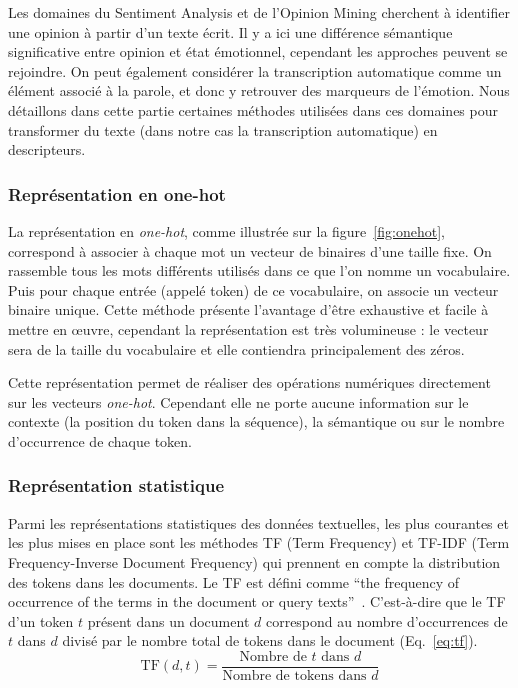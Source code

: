 Les domaines du Sentiment Analysis et de l'Opinion Mining cherchent à identifier une opinion à partir d'un texte écrit. Il y a ici une différence sémantique significative entre opinion et état émotionnel, cependant les approches peuvent se rejoindre. On peut également considérer la transcription automatique comme un élément associé à la parole, et donc y retrouver des marqueurs de l'émotion. Nous détaillons dans cette partie certaines méthodes utilisées dans ces domaines pour transformer du texte (dans notre cas la transcription automatique) en descripteurs.

\subsubsection{Représentation en one-hot}
La représentation en \textit{one-hot}, comme illustrée sur la figure~\ref{fig:onehot}, correspond à associer à chaque mot un vecteur de binaires d'une taille fixe. On rassemble tous les mots différents utilisés dans ce que l'on nomme un vocabulaire. Puis pour chaque entrée (appelé token) de ce vocabulaire, on associe un vecteur binaire unique. Cette méthode présente l'avantage d'être exhaustive et facile à mettre en œuvre, cependant la représentation est très volumineuse : le vecteur sera de la taille du vocabulaire et elle contiendra principalement des zéros.



Cette représentation permet de réaliser des opérations numériques directement sur les vecteurs \textit{one-hot}. Cependant elle ne porte aucune information sur le contexte (la position du token dans la séquence), la sémantique ou sur le nombre d’occurrence de chaque token.

\subsubsection{Représentation statistique}
Parmi les représentations statistiques des données textuelles, les plus courantes et les plus mises en place sont les méthodes TF (Term Frequency) et TF-IDF (Term Frequency-Inverse Document Frequency) qui prennent en compte la distribution des tokens dans les documents.
Le TF est défini comme ``the frequency of occurrence of the terms in the document or query texts''~\cite{salton_tf_idf}.
C'est-à-dire que le TF d'un token $t$ présent dans un document $d$ correspond au nombre d’occurrences de $t$ dans $d$ divisé par le nombre total de tokens dans le document (Eq.~\ref{eq:tf}).
\begin{equation}
    \text{TF}(d,t) = \dfrac{\text{Nombre de } t \text{ dans } d}{\text{Nombre de tokens dans } d}
\label{eq:tf}
\end{equation}


